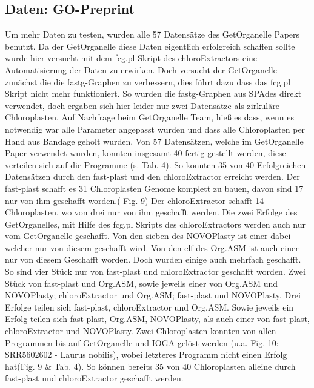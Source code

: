 \documentclass{scrartcl}
\begin{document}
\subsection{Daten: GO-Preprint}
\label{sec-4-4}
Um mehr Daten zu testen, wurden alle 57 Datensätze des GetOrganelle Papers \footnotemark[30]{} benutzt. Da der GetOrganelle diese Daten eigentlich erfolgreich schaffen sollte
wurde hier versucht mit dem fcg.pl Skript des chloroExtractors eine Automatisierung der Daten zu erwirken. Doch versucht der GetOrganelle zunächst die die fastg-Graphen
zu verbessern, dies führt dazu dass das fcg.pl Skript nicht mehr funktioniert. So wurden die fastg-Graphen aus SPAdes direkt verwendet, doch ergaben sich hier leider nur
zwei Datensätze als zirkuläre Chloroplasten. Auf Nachfrage beim GetOrganelle Team, hieß es dass, wenn es notwendig war alle Parameter angepasst wurden und dass alle 
Chloroplasten per Hand aus Bandage geholt wurden. 
Von 57 Datensätzen, welche im GetOrganelle Paper verwendet wurden, konnten  insgesamt 40 fertig gestellt werden, diese verteilen sich auf die Programme (s. Tab. 4).
So konnten 35 von 40 Erfolgreichen Datensätzen durch den fast-plast und den chloroExtractor erreicht werden.  Der fast-plast schafft es 31 Chloroplasten Genome komplett
zu bauen, davon sind 17 nur von ihm geschafft worden.( Fig. 9) Der chloroExtractor schafft 14 Chloroplasten, wo von drei nur von ihm geschafft werden. Die zwei Erfolge des GetOrganelles,
mit Hilfe des fcg.pl Skripts des chloroExtractors werden auch nur vom GetOrganelle geschafft. Von den sieben des NOVOPlasty ist einer dabei welcher nur von diesem geschafft wird.
Von den elf des Org.ASM ist auch einer nur von diesem Geschafft worden. Doch wurden einige auch mehrfach geschafft. So sind vier Stück nur von fast-plast und chloroExtractor geschafft worden.
Zwei Stück von fast-plast und Org.ASM, sowie jeweils einer von Org.ASM und NOVOPlasty; chloroExtractor und Org.ASM; fast-plast und NOVOPlasty.
Drei Erfolge teilen sich fast-plast, chloroExtractor und Org.ASM. Sowie jeweils ein Erfolg teilen sich fast-plast, Org.ASM, NOVOPlasty, als auch einer von fast-plast, chloroExtractor und NOVOPlasty.
Zwei Chloroplasten konnten von allen Programmen bis auf GetOrganelle und IOGA gelöst werden (u.a. Fig. 10: SRR5602602 - Laurus nobilis), wobei letzteres Programm nicht einen Erfolg hat(Fig. 9 \& Tab. 4). 
So können bereits 35 von 40 Chloroplasten alleine durch fast-plast und chloroExtractor geschafft werden.
\end{document}
